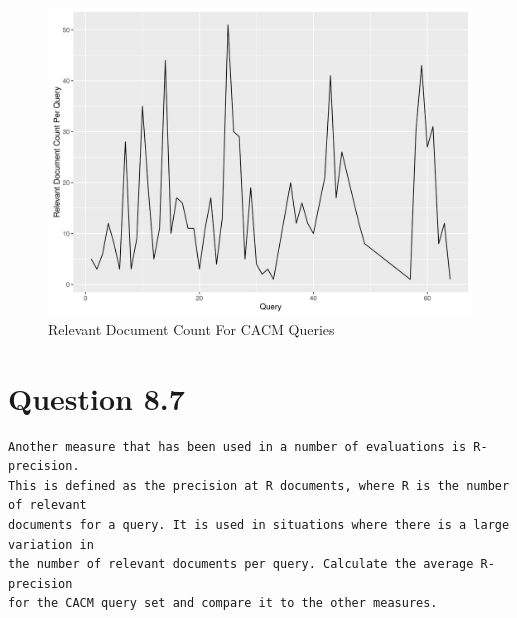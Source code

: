 \documentclass[11pt]{article}
\newenvironment{code}{\captionsetup{type=listing}}{}
\begin{document}
\begin{figure}[H]
\centering
\includegraphics[scale=0.9]{q2_plot_rc.png}
\caption{Relevant Document Count For CACM Queries}
\label{fig:q2plot3}
\end{figure}
\begin{code}
\label{code:q2py}
\end{code}
\begin{code}
\label{code:q2r}
\end{code}
\newpage
\section{Question 8.7} \label{q3}
\begin{verbatim}
Another measure that has been used in a number of evaluations is R-precision.
This is defined as the precision at R documents, where R is the number of relevant
documents for a query. It is used in situations where there is a large variation in
the number of relevant documents per query. Calculate the average R-precision
for the CACM query set and compare it to the other measures.
\end{verbatim}
\end{document}
